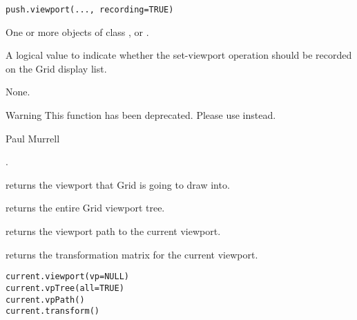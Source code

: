 %
\begin{Usage}
\begin{verbatim}
push.viewport(..., recording=TRUE)
\end{verbatim}
\end{Usage}
%
\begin{Arguments}
\begin{ldescription}
\item[\code{...}] One or more objects of class , or
.
\item[\code{recording}] A logical value to indicate whether the set-viewport
operation should be recorded on the Grid display list.
\end{ldescription}
\end{Arguments}
%
\begin{Value}
None.
\end{Value}
%
\begin{Section}{Warning}
This function has been deprecated.  Please use 
instead.
\end{Section}
%
\begin{Author}\relax
Paul Murrell
\end{Author}
%
\begin{SeeAlso}\relax
{}.
\end{SeeAlso}
%
\begin{Description}\relax
{}
returns the viewport that Grid is going to draw into.

 returns the entire Grid viewport tree.

 returns the viewport path to the current viewport.

 returns the transformation
matrix for the current viewport.
\end{Description}
%
\begin{Usage}
\begin{verbatim}
current.viewport(vp=NULL)
current.vpTree(all=TRUE)
current.vpPath()
current.transform()
\end{verbatim}
\end{Usage}
